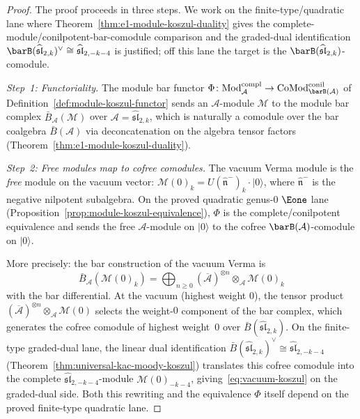 \begin{proof}
The proof proceeds in three steps. We work on the
finite-type/quadratic lane where Theorem~\ref{thm:e1-module-koszul-duality}
gives the complete-module/conilpotent-bar-comodule comparison and the
graded-dual identification $\barB(\widehat{\mathfrak{sl}}_{2,k})^\vee
\cong \widehat{\mathfrak{sl}}_{2,-k-4}$ is justified; off this lane the
target is the $\barB(\widehat{\mathfrak{sl}}_{2,k})$-comodule.

\emph{Step~1: Functoriality.}
The module bar functor
$\Phi\colon \mathrm{Mod}^{\mathrm{compl}}_{\mathcal{A}}
\to \mathrm{CoMod}^{\mathrm{conil}}_{\barB(\mathcal{A})}$
of Definition~\ref{def:module-koszul-functor}
sends an $\mathcal{A}$-module $\mathcal{M}$ to the module bar complex
$\bar{B}_{\mathcal{A}}(\mathcal{M})$ over $\mathcal{A} =
\widehat{\mathfrak{sl}}_{2,k}$, which is naturally a comodule over
the bar coalgebra $\bar{B}(\mathcal{A})$ via deconcatenation on the
algebra tensor factors
(Theorem~\ref{thm:e1-module-koszul-duality}).

\emph{Step~2: Free modules map to cofree comodules.}
The vacuum Verma module is the \emph{free} module on the vacuum
vector:
$\mathcal{M}(0)_k = U(\widehat{\mathfrak{n}}^-)_k \cdot |0\rangle$,
where $\widehat{\mathfrak{n}}^-$ is the negative nilpotent subalgebra.
On the proved quadratic genus-$0$ $\Eone$ lane
(Proposition~\ref{prop:module-koszul-equivalence}), $\Phi$ is the
complete/conilpotent equivalence and sends the free
$\mathcal{A}$-module on $|0\rangle$ to the cofree
$\barB(\mathcal{A})$-comodule on $|0\rangle$.

More precisely: the bar construction of the vacuum Verma is
\[
\bar{B}_{\mathcal{A}}(\mathcal{M}(0)_k)
= \bigoplus_{n \geq 0}
(\overline{\mathcal{A}})^{\otimes n} \otimes_{\mathcal{A}}
\mathcal{M}(0)_k
\]
with the bar differential. At the vacuum (highest weight $0$),
the tensor product $(\overline{\mathcal{A}})^{\otimes n}
\otimes_{\mathcal{A}} \mathcal{M}(0)$ selects the weight-$0$
component of the bar complex, which generates the cofree comodule
of highest weight~$0$ over $\bar{B}(\widehat{\mathfrak{sl}}_{2,k})$.
On the finite-type graded-dual lane, the linear dual identification
$\bar{B}(\widehat{\mathfrak{sl}}_{2,k})^\vee
\cong \widehat{\mathfrak{sl}}_{2,-k-4}$
(Theorem~\ref{thm:universal-kac-moody-koszul}) translates this
cofree comodule into the complete $\widehat{\mathfrak{sl}}_{2,-k-4}$-module
$\mathcal{M}(0)_{-k-4}$, giving~\eqref{eq:vacuum-koszul} on the
graded-dual side. Both this rewriting and the equivalence
$\Phi$ itself depend on the proved finite-type quadratic lane.


\end{proof}
